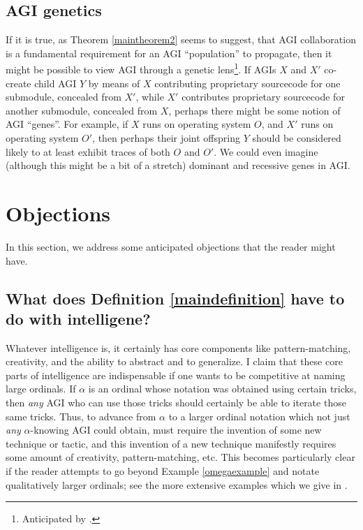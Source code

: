 \documentclass[runningheads]{llncs}
\begin{document}
\subsection{AGI genetics}

If it is true, as Theorem \ref{maintheorem2} seems to suggest, that AGI collaboration
is a fundamental requirement for an AGI ``population'' to propagate, then it might
be possible to view AGI through a genetic lens\footnote{Anticipated
by \cite{buchanan1988artificial}.}. If AGIs $X$ and $X'$ co-create child AGI $Y$ by
means of $X$ contributing proprietary sourcecode for one submodule, concealed from $X'$,
while $X'$ contributes proprietary sourcecode for another submodule, concealed from $X$,
perhaps there might be some notion of AGI ``genes''. For example, if $X$ runs on operating
system $O$, and $X'$ runs on operating system $O'$, then perhaps their joint offspring
$Y$ should be considered likely to at least exhibit traces of both $O$ and $O'$.
We could even imagine (although this might be a bit of a stretch) dominant and recessive
genes in AGI.


\section{Objections}
\label{objectionsection}

In this section, we address some anticipated objections that the reader might have.

\subsection{What does Definition \ref{maindefinition} have to do with intelligene?}

Whatever intelligence is, it certainly has core components like pattern-matching,
creativity, and the ability to abstract and to generalize.
I claim that these core parts of intelligence are indispensable if one wants to
be competitive at naming large ordinals. If $\alpha$ is an ordinal whose
notation was obtained using certain tricks, then \emph{any} AGI who can use those
tricks should certainly be able to iterate those same tricks. Thus, to advance from
$\alpha$ to a larger ordinal notation which not just \emph{any} $\alpha$-knowing
AGI could obtain, must require the invention of some new technique or tactic, and
this invention of a new technique manifestly requires some amount of creativity,
pattern-matching, etc. This becomes particularly clear if the reader attempts to
go beyond Example \ref{omegaexample} and notate qualitatively larger ordinals;
see the more extensive examples which we give in \cite{alexander2019measuring}.
\end{document}
